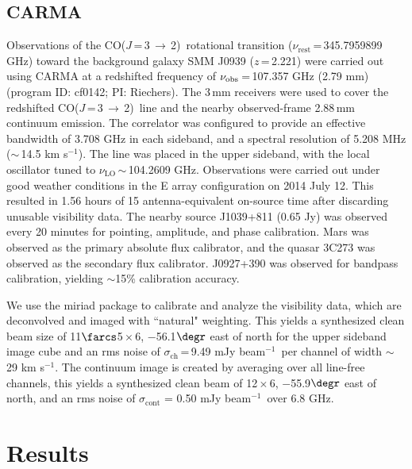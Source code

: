 \documentclass[twocolumn,apj,numberedappendix]{emulateapj}
\newcommand{\CO}{\mbox{CO($J$\,=\,3\,$\rightarrow$\,2) }}
\newcommand{\pmOne}{\mbox{$^{-1}$}}
\begin{document}
\subsection{CARMA} \label{sec:carmadata}
Observations of the \CO rotational transition ($\nu_\textrm{rest}$\,=\,345.7959899 GHz) toward the background galaxy SMM
J0939 ($z$\,=\,2.221) were carried out using CARMA at a redshifted frequency of $\nu_{\rm obs}$\,=\,107.357\,\,GHz (2.79\,\,mm)  (program ID: cf0142; PI: Riechers). The 3\,mm receivers were used to cover the redshifted \CO line and the nearby observed-frame 2.88\,mm continuum emission. The correlator was configured to provide an effective bandwidth of 3.708 GHz in each sideband, and a spectral resolution of 5.208 MHz ($\sim$\,14.5 km\,\,s\pmOne). 
The line was placed in the
upper sideband, with the local oscillator tuned to $\nu_\textrm{LO}$\,$\sim$\,104.2609 GHz. %
Observations were carried out under good
weather conditions in the E array configuration on 2014 July 12. This resulted in 1.56 hours of 15 antenna-equivalent on-source time after discarding unusable visibility data.
The nearby source J1039+811 (0.65\,\,Jy) was observed every 20 minutes for
pointing, amplitude, and phase calibration. Mars was observed as the primary
absolute flux calibrator, and the quasar 3C273 was observed as the secondary
flux calibrator. J0927+390 was observed for bandpass calibration, yielding $\sim
$15\% calibration accuracy. \par
We use the {\sc miriad} package to calibrate and analyze the visibility data, which are deconvolved and imaged with ``natural" weighting.
This yields a synthesized clean beam size of 11$\farcs$5\,$\times$\,6, $-$56.1$\degr$ east of north for the upper sideband image cube and an rms noise of $\sigma_\textrm{ch}$\,=\,9.49\,\,mJy\,\,beam\pmOne\ per channel
of width $\sim$\,29 km\,\,s\pmOne.
The continuum image is created by
averaging over all line-free channels, this yields a synthesized clean beam of 12\,$\times$\,6, $-$55.9$\degr$ east of north, and an rms noise of $\sigma_\textrm{cont}$ = 0.50\,\,mJy\,\,beam\pmOne\ over 6.8 GHz.
\section{Results}\label{sec:res}
\end{document}
